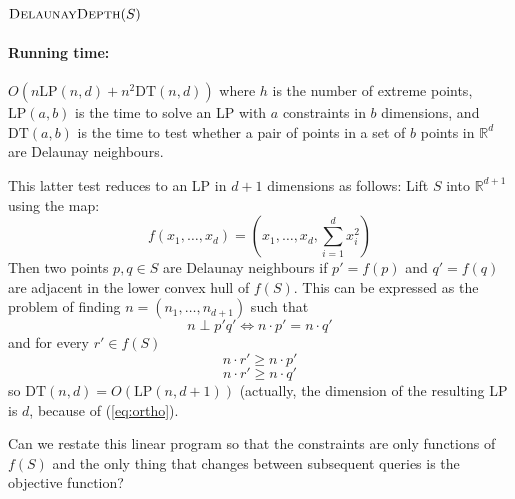 \documentclass[12pt]{article}
\newcommand{\LP}{\mathrm{LP}}
\newcommand{\DT}{\mathrm{DT}}
\begin{document}
\noindent$\textsc{DelaunayDepth}(S)$
\begin{algorithmic}[1]
     \ENDIF
  \ENDFOR
\ENDWHILE
\end{algorithmic}

\paragraph{Running time:} $O(n\LP(n,d) + n^2\DT(n,d))$ where $h$ is the
number of extreme points, $\LP(a,b)$ is the time to solve an LP with $a$
constraints in $b$ dimensions, and $\DT(a,b)$ is the time to test whether a
pair of points in a set of $b$ points in $\mathbb{R}^d$ are Delaunay
neighbours.

This latter test reduces to an LP in $d+1$ dimensions as follows:  Lift $S$ into $\mathbb{R}^{d+1}$ using the map:
\[  f(x_1,\ldots,x_d) = \left(x_1,\ldots,x_d,\sum_{i=1}^d x_i^2\right) \]
Then two points $p,q\in S$ are Delaunay neighbours if $p'=f(p)$ and $q'=f(q)$ are adjacent in the lower convex hull of $f(S)$.  This can be expressed as the problem of finding $n=(n_1,\ldots,n_{d+1})$ such that
\begin{equation}
n\perp p'q' \Leftrightarrow n\cdot p' = n\cdot q' \label{eq:ortho}
\end{equation}
and for every $r'\in f(S)$
\begin{equation}
 n\cdot r' \ge n\cdot p' \label{eq:inhullp}
\end{equation}
\begin{equation}
 n\cdot r' \ge n\cdot q' \label{eq:inhullq}
\end{equation}
so $\DT(n,d)=O(\LP(n,d+1))$ (actually, the dimension of the resulting LP is
$d$, because of (\ref{eq:ortho}).

Can we restate this linear program so that the constraints are only functions
of $f(S)$ and the only thing that changes between subsequent queries is the
objective function?
\end{document}
